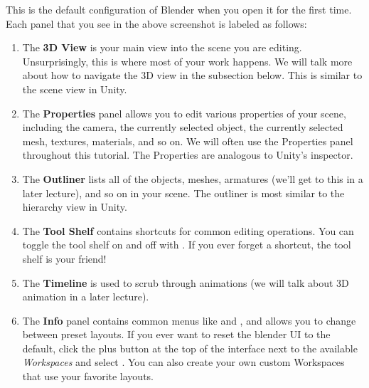 \documentclass[11pt]{article}
\begin{document}
\noindent This is the default configuration of Blender when you open it for the first time.  Each
panel that you see in the above screenshot is labeled as follows:
\begin{enumerate}
    \item The \textbf{3D View} is your main view into the scene you are editing.  Unsurprisingly,
    this is where most of your work happens.  We will talk more about how to navigate the 3D view
    in the subsection below.  This is similar to the scene view in Unity.
    \item The \textbf{Properties} panel allows you to edit various properties of your scene, 
    including the camera, the currently selected object, the currently selected mesh, textures,
    materials, and so on.  We will often use the Properties panel throughout this tutorial.
    The Properties are analogous to Unity's inspector.
    \item The \textbf{Outliner} lists all of the objects, meshes, armatures (we'll get to this in a
    later lecture), and so on in your scene.  The outliner is most similar to the hierarchy view in
    Unity.
    \item The \textbf{Tool Shelf} contains shortcuts for common editing operations.  You can toggle
    the tool shelf on and off with .  If you ever forget a shortcut, the tool shelf is your
    friend!
    \item The \textbf{Timeline} is used to scrub through animations (we will talk about 3D animation
    in a later lecture).
    \item The \textbf{Info} panel contains common menus like  and , and
    allows you to change between preset layouts.  If you ever want to reset the blender UI to the 
    default, click the plus button at the top of the interface next to the available {\it Workspaces}
    and select .  You can also create your own custom Workspaces that use
    your favorite layouts.
\end{enumerate}
\end{document}
